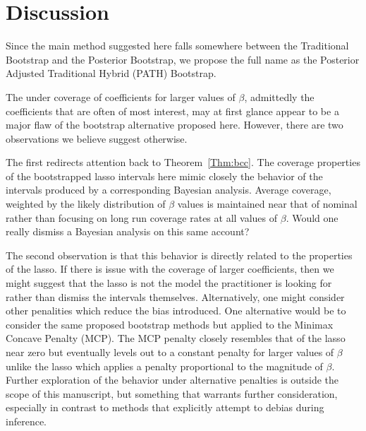 \section{Discussion}

Since the main method suggested here falls somewhere between the Traditional Bootstrap and the Posterior Bootstrap, we propose the full name as the Posterior Adjusted Traditional Hybrid (PATH) Bootstrap.

The under coverage of coefficients for larger values of $\beta$, admittedly the coefficients that are often of most interest, may at first glance appear to be a major flaw of the bootstrap alternative proposed here. However, there are two observations we believe suggest otherwise. 

The first redirects attention back to Theorem~\ref{Thm:bcc}. The coverage properties of the bootstrapped lasso intervals here mimic closely the behavior of the intervals produced by a corresponding Bayesian analysis. Average coverage, weighted by the likely distribution of $\beta$ values is maintained near that of nominal rather than focusing on long run coverage rates at all values of $\beta$. Would one really dismiss a Bayesian analysis on this same account? 

The second observation is that this behavior is directly related to the properties of the lasso. If there is issue with the coverage of larger coefficients, then we might suggest that the lasso is not the model the practitioner is looking for rather than dismiss the intervals themselves. Alternatively, one might consider other penalities which reduce the bias introduced. One alternative would be to consider the same proposed bootstrap methods but applied to the Minimax Concave Penalty (MCP). The MCP penalty closely resembles that of the lasso near zero but eventually levels out to a constant penalty for larger values of $\beta$ unlike the lasso which applies a penalty proportional to the magnitude of $\beta$. Further exploration of the behavior under alternative penalties is outside the scope of this manuscript, but something that warrants further consideration, especially in contrast to methods that explicitly attempt to debias during inference.

